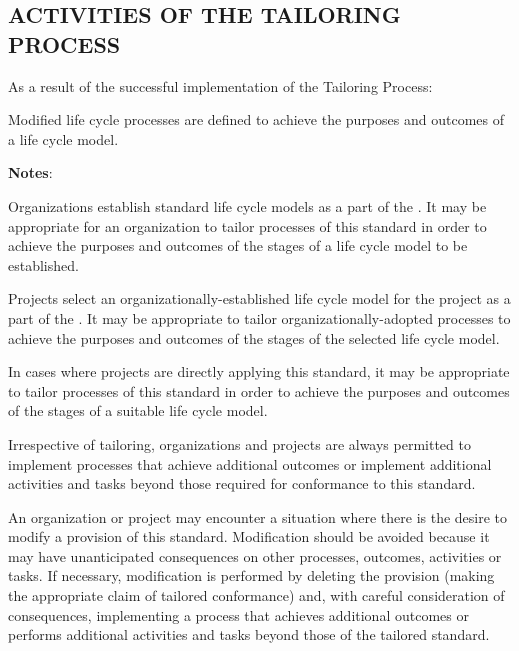 	\subsection{ACTIVITIES OF THE TAILORING PROCESS}
	\begin{adjustwidth}{0.5em}{0pt}
	
		As a result of the successful implementation of the Tailoring Process:

		\begin{compactenum}

			\item Modified life cycle processes are defined to achieve the purposes and outcomes of a life cycle model.
		
		\end{compactenum}

		{\bf Notes}:

		\begin{compactitem}
			\item Organizations establish standard life cycle models as a part of the . It may be appropriate for an organization to tailor processes of this standard in order to achieve the purposes and outcomes of the stages of a life cycle model to be established.

			\item Projects select an organizationally-established life cycle model for the project as a part of the . It may be appropriate to tailor organizationally-adopted processes to achieve the purposes and outcomes of the stages of the selected life cycle model.

			\item In cases where projects are directly applying this standard, it may be appropriate to tailor processes of this standard in order to achieve the purposes and outcomes of the stages of a suitable life cycle model.

			\item Irrespective of tailoring, organizations and projects are always permitted to implement processes that achieve additional outcomes or implement additional activities and tasks beyond those required for conformance to this standard.

			\item An organization or project may encounter a situation where there is the desire to modify a provision of this standard. Modification should be avoided because it may have unanticipated consequences on other processes, outcomes, activities or tasks. If necessary, modification is performed by deleting the provision (making the appropriate claim of tailored conformance) and, with careful consideration of consequences, implementing a process that achieves additional outcomes or performs additional activities and tasks beyond those of the tailored standard.

		\end{compactitem}

	\end{adjustwidth}